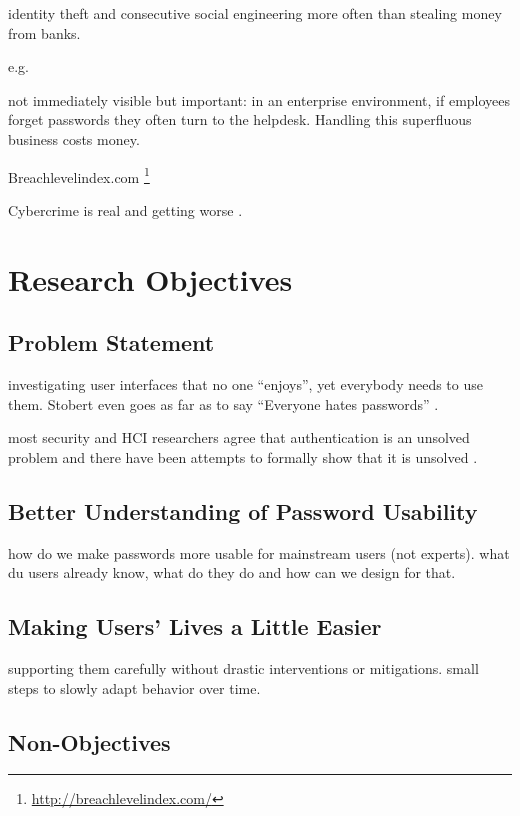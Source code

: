identity theft and consecutive social engineering more often than stealing money from banks.

 e.g. \cite{CSID2012PasswordHabits} 

not immediately visible but important: in an enterprise environment, if employees forget passwords they often turn to the helpdesk. Handling this superfluous business costs money. 

Breachlevelindex.com \footnote{\url{http://breachlevelindex.com/}}

Cybercrime is real and getting worse \cite{BKA2016Bundeslagebild}.

\section{Research Objectives}\label{sec:intro:researchobjectives}

\subsection{Problem Statement}
investigating user interfaces that no one ``enjoys'', yet everybody needs to use them. Stobert even goes as far as to say ``Everyone hates passwords'' \cite{Stobert2014Agony}.

most security and HCI researchers agree that authentication is an unsolved problem and there have been attempts to formally show that it is unsolved \cite{Bonneau2012ReplacePasswords, Bonneau2015ImperfectAuthentication, Herley2012PersistenceOfPasswords}. 

\subsection{Better Understanding of Password Usability}
how do we make passwords more usable for mainstream users (not experts). what du users already know, what do they do and how can we design for that. 

\subsection{Making Users' Lives a Little Easier}
supporting them carefully without drastic interventions or mitigations. small steps to slowly adapt behavior over time. 


\subsection{Non-Objectives}\label{sec:intro:non_objectives}

